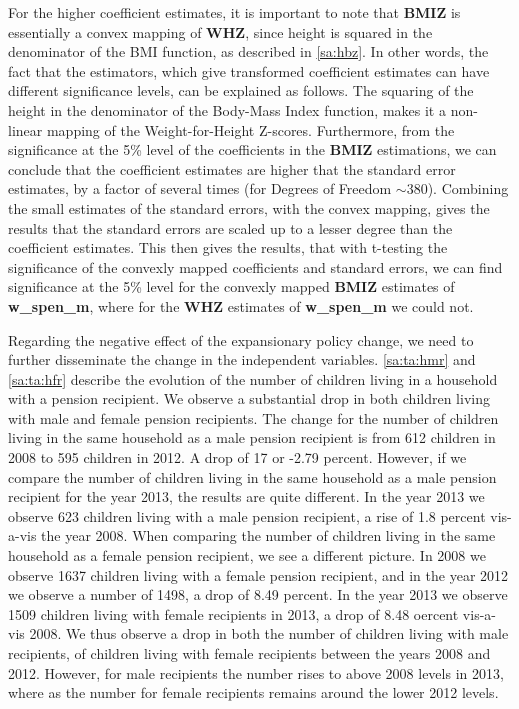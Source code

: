 \begin{refsection}
For the higher coefficient estimates, it is important to note that \textbf{BMIZ} is essentially a convex mapping of \textbf{WHZ},
since height is squared in the denominator of the BMI function, as described in \autoref{sa:hbz}.
In other words, the fact that the estimators, which give transformed coefficient estimates can have different significance levels,
can be explained as follows.
The squaring of the height in the denominator of the Body-Mass Index function, makes it a non-linear mapping of the Weight-for-Height Z-scores.
Furthermore, from the significance at the 5\% level of the coefficients in the \textbf{BMIZ} estimations,
we can conclude that the coefficient estimates are higher that the standard error estimates,
by a factor of several times (for Degrees of Freedom $\sim 380$).
Combining the small estimates of the standard errors, with the convex mapping,
gives the results that the standard errors are scaled up to a lesser degree than the coefficient estimates.
This then gives the results, that with t-testing the significance of the convexly mapped coefficients and standard errors,
we can find significance at the 5\% level for the convexly mapped \textbf{BMIZ} estimates of \textbf{w\_spen\_m},
where for the \textbf{WHZ} estimates of \textbf{w\_spen\_m} we could not.

Regarding the negative effect of the expansionary policy change, we need to further disseminate the change in the independent variables.
\autoref{sa:ta:hmr} and \autoref{sa:ta:hfr} describe the evolution of the number of children living in a household with a pension recipient.
We observe a substantial drop in both children living with male and female pension recipients.
The change for the number of children living in the same household as a male pension recipient is from 612 children in 2008 to 595 children in 2012. A drop of 17 or -2.79 percent.
However, if we compare the number of children living in the same household as a male pension recipient for the year 2013,
the results are quite different.
In the year 2013 we observe 623 children living with a male pension recipient, a rise of 1.8 percent vis-a-vis the year 2008.
When comparing the number of children living in the same household as a female pension recipient, we see a different picture.
In 2008 we observe 1637 children living with a female pension recipient,
and in the year 2012 we observe a number of 1498, a drop of 8.49 percent.
In the year 2013 we observe 1509 children living with female recipients in 2013,
a drop of 8.48 oercent vis-a-vis 2008.
We thus observe a drop in both the number of children living with male recipients,
of children living with female recipients between the years 2008 and 2012.
However, for male recipients the number rises to above 2008 levels in 2013,
where as the number for female recipients remains around the lower 2012 levels.


\end{refsection}
